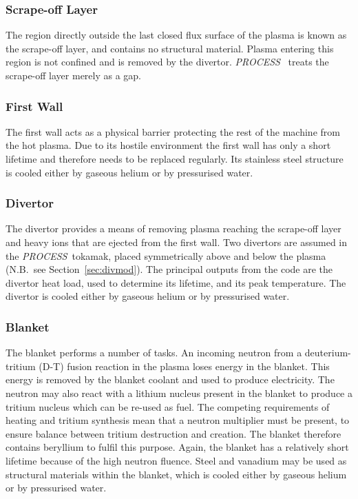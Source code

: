 \documentclass[11pt,a4paper]{report}
\newcommand{\PS}{\mbox{\it PROCESS\/ }}
\begin{document}
\subsubsection{Scrape-off Layer}
The region directly outside the last closed flux surface of the plasma is
known as the scrape-off layer, and contains no structural material.  Plasma
entering this region is not confined and is removed by the divertor. \PS
treats the scrape-off layer merely as a gap.

\subsubsection{First Wall}
The first wall acts as a physical barrier protecting the rest of the machine
from the hot plasma. Due to its hostile environment the first wall has only a
short lifetime and therefore needs to be replaced regularly. Its stainless
steel structure is cooled either by gaseous helium or by pressurised water.

\subsubsection{Divertor}
The divertor provides a means of removing plasma reaching the scrape-off layer
and heavy ions that are ejected from the first wall.  Two divertors are
assumed in the \PS tokamak, placed symmetrically above and below the plasma
(N.B.\ see Section~\ref{sec:divmod}). The principal outputs from the code
are the divertor heat load, used to determine its lifetime, and its peak
temperature. The divertor is cooled either by gaseous helium or by pressurised
water.

\subsubsection{Blanket}
The blanket performs a number of tasks. An incoming neutron from a
deuterium-tritium (D-T) fusion reaction in the plasma loses energy in the
blanket. This energy is removed by the blanket coolant and used to produce
electricity. The neutron may also react with a lithium nucleus present in the
blanket to produce a tritium nucleus which can be re-used as fuel. The
competing requirements of heating and tritium synthesis mean that a neutron
multiplier must be present, to ensure balance between tritium destruction and
creation. The blanket therefore contains beryllium to fulfil this
purpose. Again, the blanket has a relatively short lifetime because of the
high neutron fluence. Steel and vanadium may be used as structural materials
within the blanket, which is cooled either by gaseous helium or by pressurised
water.
\end{document}
